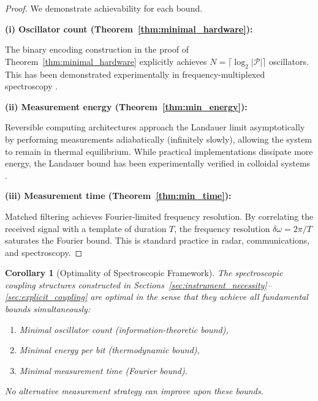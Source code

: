 \documentclass[twocolumn,10pt,a4paper]{article}
\newtheorem{corollary}[theorem]{Corollary}
\theoremstyle{remark}
\newcommand{\partition}{\mathcal{P}}
\begin{document}
\begin{proof}
We demonstrate achievability for each bound.

\textbf{(i) Oscillator count (Theorem~\ref{thm:minimal_hardware}):}

The binary encoding construction in the proof of Theorem~\ref{thm:minimal_hardware} explicitly achieves $N = \lceil \log_2 |\partition| \rceil$ oscillators. This has been demonstrated experimentally in frequency-multiplexed spectroscopy \citep{Schawlow1958}.

\textbf{(ii) Measurement energy (Theorem~\ref{thm:min_energy}):}

Reversible computing architectures \citep{Bennett1982} approach the Landauer limit asymptotically by performing measurements adiabatically (infinitely slowly), allowing the system to remain in thermal equilibrium. While practical implementations dissipate more energy, the Landauer bound has been experimentally verified in colloidal systems \citep{Berut2012}.

\textbf{(iii) Measurement time (Theorem~\ref{thm:min_time}):}

Matched filtering \citep{Turin1960} achieves Fourier-limited frequency resolution. By correlating the received signal with a template of duration $T$, the frequency resolution $\delta\omega = 2\pi/T$ saturates the Fourier bound. This is standard practice in radar, communications, and spectroscopy.
\end{proof}

\begin{corollary}[Optimality of Spectroscopic Framework]
\label{cor:optimality}
The spectroscopic coupling structures constructed in Sections~\ref{sec:instrument_necessity}--\ref{sec:explicit_coupling} are \emph{optimal} in the sense that they achieve all fundamental bounds simultaneously:
\begin{enumerate}[label=(\roman*), noitemsep]
    \item Minimal oscillator count (information-theoretic bound),
    \item Minimal energy per bit (thermodynamic bound),
    \item Minimal measurement time (Fourier bound).
\end{enumerate}
No alternative measurement strategy can improve upon these bounds.
\end{corollary}
\end{document}
